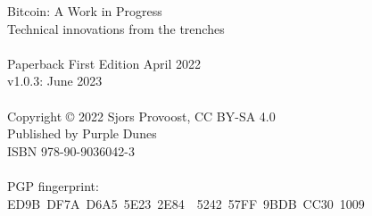 \newpage
{\setlength{\parindent}{0cm}
\begin{vplace}
Bitcoin: A Work in Progress\\
Technical innovations from the trenches\\
\\
Paperback First Edition April 2022\\
v1.0.3: June 2023\\
\\
Copyright © 2022 Sjors Provoost, CC BY-SA 4.0\\
Published by Purple Dunes\\
ISBN 978-90-9036042-3\\


\\

PGP fingerprint:\\
ED9B DF7A D6A5 5E23 2E84  5242 57FF 9BDB CC30 1009\\

\end{vplace}
}
